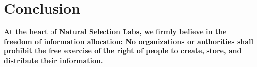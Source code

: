 \section{Conclusion} 

\textbf{At the heart of Natural Selection Labs, we firmly believe in the freedom of information allocation: No organizations or authorities shall prohibit the free exercise of the right of people to create, store, and distribute their information.}